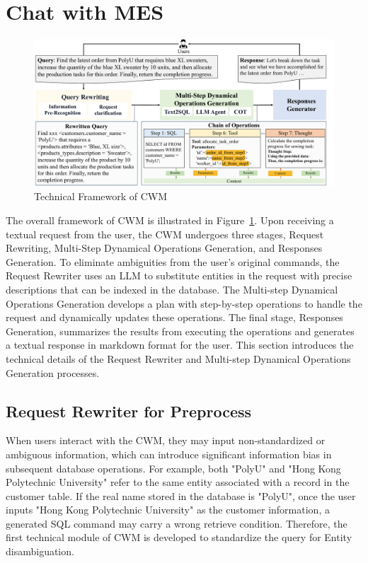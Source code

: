 \documentclass[preprint,12pt]{elsarticle}
\begin{document}
\section{Chat with MES}
\label{sec:method}
\begin{figure}[t]%
\centering%
\includegraphics[width=1.05\linewidth]{figs/flow.pdf}
\caption{Technical Framework of CWM}
\label{fig:cwm_framework}
\end{figure}
The overall framework of CWM is illustrated in Figure~\ref{fig:cwm_framework}.
Upon receiving a textual request from the user, the CWM undergoes three stages, Request Rewriting, Multi-Step Dynamical Operations Generation, and Responses Generation.
To eliminate ambiguities from the user's original commands, the Request Rewriter uses an LLM to substitute entities in the request with precise descriptions that can be indexed in the database.
The Multi-step Dynamical Operations Generation develops a plan with step-by-step operations to handle the request and dynamically updates these operations.
The final stage, Responses Generation, summarizes the results from executing the operations and generates a textual response in markdown format for the user.
This section introduces the technical details of the Request Rewriter and Multi-step Dynamical Operations Generation processes.


\subsection{Request Rewriter for Preprocess}
When users interact with the CWM, they may input non-standardized or ambiguous information, which can introduce significant information bias in subsequent database operations.
For example, both "PolyU" and "Hong Kong Polytechnic University" refer to the same entity associated with a record in the customer table.
If the real name stored in the database is "PolyU", once the user inputs "Hong Kong Polytechnic University" as the customer information, a generated SQL command may carry a wrong retrieve condition.
Therefore, the first technical module of CWM is developed to
standardize the query for Entity disambiguation.
\end{document}
